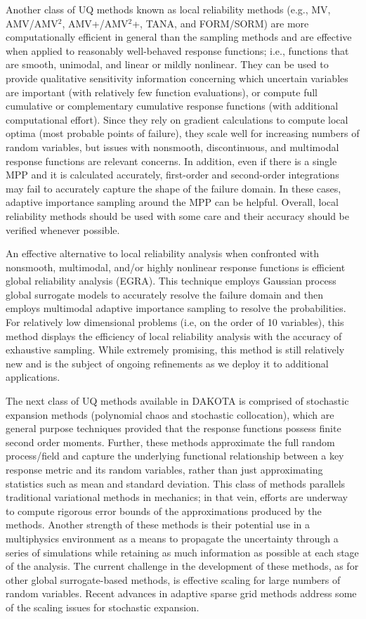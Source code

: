 Another class of UQ methods known as local reliability methods (e.g.,
MV, AMV/AMV$^2$, AMV+/AMV$^2$+, TANA, and FORM/SORM) are more
computationally efficient in general than the sampling methods and are
effective when applied to reasonably well-behaved response functions;
i.e., functions that are smooth, unimodal, and linear or mildly
nonlinear. They can be used to provide qualitative sensitivity
information concerning which uncertain variables are important (with
relatively few function evaluations), or compute full cumulative or
complementary cumulative response functions (with additional
computational effort).  Since they rely on gradient calculations to
compute local optima (most probable points of failure), they scale
well for increasing numbers of random variables, but issues with
nonsmooth, discontinuous, and multimodal response functions are
relevant concerns. In addition, even if there is a single MPP and it
is calculated accurately, first-order and second-order integrations
may fail to accurately capture the shape of the failure domain.  In
these cases, adaptive importance sampling around the MPP can be
helpful.  Overall, local reliability methods should be used with some
care and their accuracy should be verified whenever possible.

An effective alternative to local reliability analysis when confronted
with nonsmooth, multimodal, and/or highly nonlinear response functions
is efficient global reliability analysis (EGRA).  This technique
employs Gaussian process global surrogate models to accurately resolve
the failure domain and then employs multimodal adaptive importance
sampling to resolve the probabilities.  For relatively low dimensional
problems (i.e, on the order of 10 variables), this method displays the
efficiency of local reliability analysis with the accuracy of
exhaustive sampling.  While extremely promising, this method is still
relatively new and is the subject of ongoing refinements as we deploy
it to additional applications.

The next class of UQ methods available in DAKOTA is comprised of
stochastic expansion methods (polynomial chaos and stochastic
collocation), which are general purpose techniques provided that the
response functions possess finite second order moments. Further, these
methods approximate the full random process/field and capture the
underlying functional relationship between a key response metric and
its random variables, rather than just approximating statistics such
as mean and standard deviation. This class of methods parallels
traditional variational methods in mechanics; in that vein, efforts
are underway to compute rigorous error bounds of the approximations
produced by the methods. Another strength of these methods is their
potential use in a multiphysics environment as a means to propagate
the uncertainty through a series of simulations while retaining as
much information as possible at each stage of the analysis.  The
current challenge in the development of these methods, as for other
global surrogate-based methods, is effective scaling for large numbers
of random variables.  Recent advances in adaptive sparse grid methods 
address some of the scaling issues for stochastic expansion.

